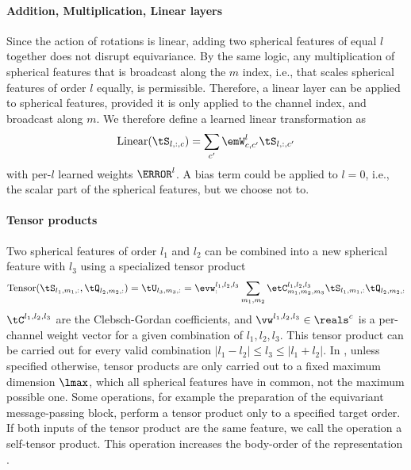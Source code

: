 \documentclass[10pt]{article}
\begin{document}
\paragraph{Addition, Multiplication, Linear layers} Since the action of rotations is linear, adding two spherical features of equal $l$ together does not disrupt equivariance. By the same logic, any multiplication of spherical features that is broadcast along the $m$ index, i.e., that scales spherical features of order $l$ equally, is permissible.
Therefore, a linear layer can be applied to spherical features, provided it is only applied to the channel index, and broadcast along $m$. We therefore define a learned linear transformation as
\begin{equation}
    \text{Linear}(\tS_{l,:,c}) = \sum_{c'} \emW_{c,c'}^l \tS_{l,:,c'}
\end{equation}
with per-$l$ learned weights $\mW^l$. A bias term could be applied to $l=0$, i.e., the scalar part of the spherical features, but we choose not to.

\paragraph{Tensor products} Two spherical features of order $l_1$ and $l_2$ can be combined into a new spherical feature with $l_3$ using a specialized tensor product
\begin{equation}
    \text{Tensor}(\tS_{l_1,m_1,:}, \tQ_{l_2,m_2,:}) = \tU_{l_3,m_3,:}
    = \evw^{l_1,l_2,l_3}_{:} \sum_{m_1,m_2} \etC_{m_1,m_2,m_3}^{l_1,l_2,l_3} \tS_{l_1,m_1,:} \tQ_{l_2,m_2,:}
\end{equation}
$\tC^{l_1,l_2,l_3}$ are the Clebsch-Gordan coefficients, and $\vw^{l_1,l_2,l_3} \in \reals^c$ is a per-channel weight vector for a given combination of $l_1,l_2,l_3$. This tensor product can be carried out for every valid combination $|l_1 - l_2| \leq l_3 \leq |l_1 + l_2|$.
In \lorem, unless specified otherwise, tensor products are only carried out to a fixed maximum dimension $\lmax$, which all spherical features have in common, not the maximum possible one. Some operations, for example the preparation of the equivariant message-passing block, perform a tensor product only to a specified target order.
If both inputs of the tensor product are the same feature, we call the operation a self-tensor product. This operation increases the body-order of the representation \citep{dbcdevo2022,bksoc2022}.
\end{document}
